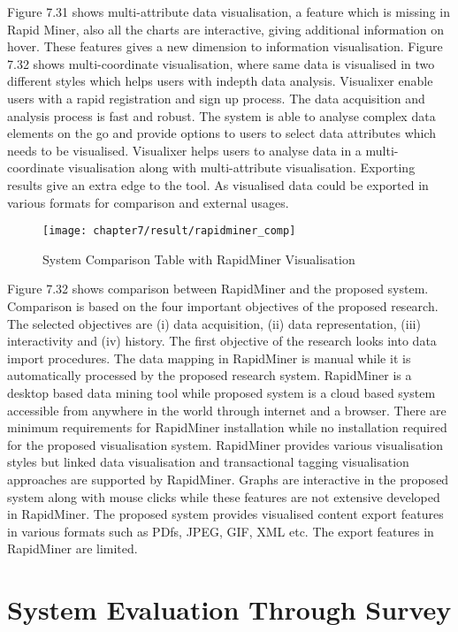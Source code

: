 Figure 7.31 shows multi-attribute data visualisation, a feature which is missing in Rapid Miner, also all the charts are interactive, giving additional information on hover. These features gives a new dimension to information visualisation. Figure 7.32 shows multi-coordinate visualisation, where same data is visualised in two different styles which helps users with indepth data analysis. Visualixer enable users with a rapid registration and sign up process. The data acquisition and analysis process is fast and robust. The system is able to analyse complex data elements on the go and provide options to users to select data attributes which needs to be visualised. Visualixer helps users to analyse data in a multi-coordinate visualisation along with multi-attribute visualisation. Exporting results give an extra edge to the tool. As visualised data could be exported in various formats for comparison and external usages.\\

\begin{figure}
\centering
\texttt{[image: chapter7/result/rapidminer\_comp]}
\caption{System Comparison Table with RapidMiner Visualisation}
\end{figure}

Figure 7.32 shows comparison between RapidMiner and the proposed system. Comparison is based on the four important objectives of the proposed research. The selected objectives are (i) data acquisition, (ii) data representation, (iii) interactivity and (iv) history. The first objective of the research looks into data import procedures. The data mapping in RapidMiner is manual while it is automatically processed by the proposed research system. RapidMiner is a desktop based data mining tool while proposed system is a cloud based system accessible from anywhere in the world through internet and a browser. There are minimum requirements for RapidMiner installation while no installation required for the proposed visualisation system. RapidMiner provides various visualisation styles but linked data visualisation and transactional tagging visualisation approaches are supported by RapidMiner. Graphs are interactive in the proposed system along with mouse clicks while these features are not extensive developed in RapidMiner. The proposed system provides visualised content export features in various formats such as PDfs, JPEG, GIF, XML etc. The export features in RapidMiner are limited.

\section{System Evaluation Through Survey}


